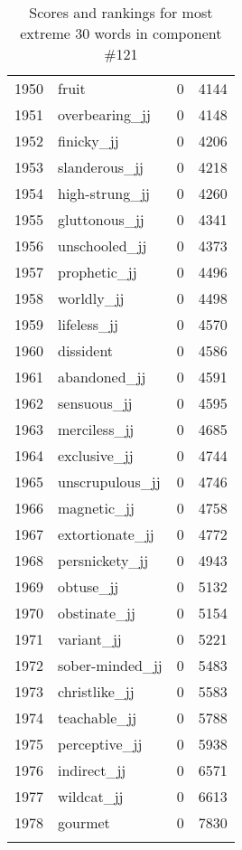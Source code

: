 \begin{longtable}[!htbp]{| rlr@{.}l |}
    1950 & fruit & 0 & 4144 \\
    1951 & overbearing\_jj & 0 & 4148 \\
    1952 & finicky\_jj & 0 & 4206 \\
    1953 & slanderous\_jj & 0 & 4218 \\
    1954 & high-strung\_jj & 0 & 4260 \\
    1955 & gluttonous\_jj & 0 & 4341 \\
    1956 & unschooled\_jj & 0 & 4373 \\
    1957 & prophetic\_jj & 0 & 4496 \\
    1958 & worldly\_jj & 0 & 4498 \\
    1959 & lifeless\_jj & 0 & 4570 \\
    1960 & dissident & 0 & 4586 \\
    1961 & abandoned\_jj & 0 & 4591 \\
    1962 & sensuous\_jj & 0 & 4595 \\
    1963 & merciless\_jj & 0 & 4685 \\
    1964 & exclusive\_jj & 0 & 4744 \\
    1965 & unscrupulous\_jj & 0 & 4746 \\
    1966 & magnetic\_jj & 0 & 4758 \\
    1967 & extortionate\_jj & 0 & 4772 \\
    1968 & persnickety\_jj & 0 & 4943 \\
    1969 & obtuse\_jj & 0 & 5132 \\
    1970 & obstinate\_jj & 0 & 5154 \\
    1971 & variant\_jj & 0 & 5221 \\
    1972 & sober-minded\_jj & 0 & 5483 \\
    1973 & christlike\_jj & 0 & 5583 \\
    1974 & teachable\_jj & 0 & 5788 \\
    1975 & perceptive\_jj & 0 & 5938 \\
    1976 & indirect\_jj & 0 & 6571 \\
    1977 & wildcat\_jj & 0 & 6613 \\
    1978 & gourmet & 0 & 7830 \\
    \hline
    \caption{Scores and rankings for most extreme 30 words in component \#121} \\
\end{longtable}
